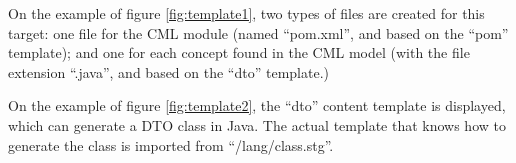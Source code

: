 On the example of figure \ref{fig:template1},
two types of files are created for this target:
one file for the CML module (named ``pom.xml'', and based on the ``pom'' template); and one for each concept found in the CML model (with the file extension ``.java'', and based on the ``dto'' template.)

On the example of figure \ref{fig:template2}, the ``dto'' content template is displayed, which can generate a DTO class in Java. The actual template that knows how to generate the class is imported from ``/lang/class.stg''.
